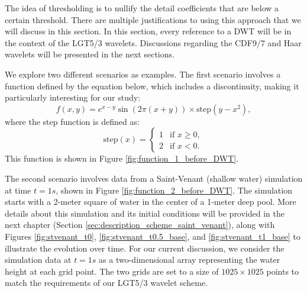 
The idea of thresholding is to nullify the detail coefficients that are below a certain threshold.
There are multiple justifications to using this approach that we will discuss in this section.
In this section, every reference to a DWT will be in the context of the LGT5/3 wavelets.
Discussions regarding the CDF9/7 and Haar wavelets will be presented in the next sections.

We explore two different scenarios as examples.
The first scenario involves a function defined by the equation below, which includes a discontinuity, making it particularly interesting for our study:
\[
    f(x,y) = e^{x-y} \sin(2\pi(x+y)) \times \text{step}(y - x^2),
\]
where the step function is defined as:
\[
    \text{step}(x) = \begin{cases}
        1 & \text{if } x \geq 0,\\
        2 & \text{if } x < 0.
    \end{cases}
\]
This function is shown in Figure \ref{fig:function_1_before_DWT}.

The second scenario involves data from a Saint-Venant (shallow water) simulation at time $t=1s$, shown in Figure \ref{fig:function_2_before_DWT}.
The simulation starts with a 2-meter square of water in the center of a 1-meter deep pool.
More details about this simulation and its initial conditions will be provided in the next chapter (Section \ref{sec:description_scheme_saint_venant}), along with Figures \ref{fig:stvenant_t0}, \ref{fig:stvenant_t0.5_base}, and \ref{fig:stvenant_t1_base} to illustrate the evolution over time.
For our current discussion, we consider the simulation data at $t=1s$ as a two-dimensional array representing the water height at each grid point.
The two grids are set to a size of $1025\times1025$ points to match the requirements of our LGT5/3 wavelet scheme.

